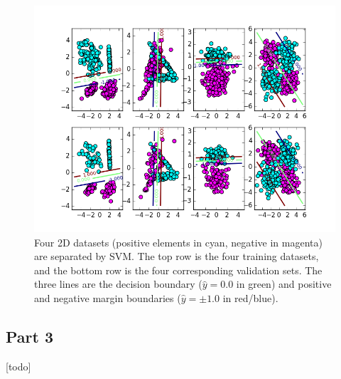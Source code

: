 \begin{figure}
	\centering
	\includegraphics [trim=0 0 0 0, clip, angle=0, width=0.8\columnwidth,
	keepaspectratio]{figures/2_2_decisions}
	\caption{Four 2D datasets (positive elements in cyan, negative in magenta) are separated by SVM. The top row is the four training datasets, and the bottom row is the four corresponding validation sets.
	The three lines are the decision boundary ($\hat{y}=0.0$ in green) and positive and negative margin boundaries ($\hat{y}=\pm1.0$ in red/blue).}
	\label{fig:2_2_decisions} 
\end{figure}

\subsection{Part 3}
[todo]

